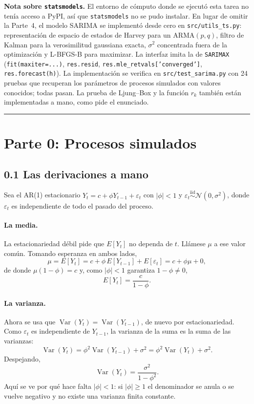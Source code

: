 \documentclass[11pt]{article}
\begin{document}
\textbf{Nota sobre \texttt{statsmodels}.} El entorno de c\'omputo donde se
ejecut\'o esta tarea no ten\'ia acceso a PyPI, as\'i que
\texttt{statsmodels} no se pudo instalar. En lugar de omitir la Parte~4, el
modelo SARIMA se implement\'o desde cero en \texttt{src/utils\_ts.py}:
representaci\'on de espacio de estados de Harvey para un ARMA$(p,q)$, filtro
de Kalman para la verosimilitud gaussiana exacta, $\sigma^2$ concentrada
fuera de la optimizaci\'on y L-BFGS-B para maximizar. La interfaz imita la
de \texttt{SARIMAX} (\texttt{fit(maxiter=...)}, \texttt{res.resid},
\texttt{res.mle\_retvals['converged']}, \texttt{res.forecast(h)}). La
implementaci\'on se verifica en \texttt{src/test\_sarima.py} con
\num{24} pruebas que recuperan los par\'ametros de procesos simulados con
valores conocidos; todas pasan. La prueba de Ljung--Box y la funci\'on
$r_k$ tambi\'en est\'an implementadas a mano, como pide el enunciado.
\normalsize
\noindent\rule{\textwidth}{0.4pt}

\tableofcontents
\newpage

\section{Parte 0: Procesos simulados}

\subsection{0.1 Las derivaciones a mano}

Sea el AR(1) estacionario $Y_t = c + \phi Y_{t-1} + \varepsilon_t$ con
$|\phi| < 1$ y $\varepsilon_t \stackrel{\text{iid}}{\sim}
\mathcal{N}(0,\sigma^2)$, donde $\varepsilon_t$ es independiente de todo el
pasado del proceso.

\paragraph{La media.} La estacionariedad d\'ebil pide que $E[Y_t]$ no
dependa de $t$. Ll\'amese $\mu$ a ese valor com\'un. Tomando esperanza en
ambos lados,
\[
\mu = E[Y_t] = c + \phi\, E[Y_{t-1}] + E[\varepsilon_t] = c + \phi\mu + 0,
\]
de donde $\mu(1-\phi) = c$ y, como $|\phi|<1$ garantiza $1-\phi \neq 0$,
\[
\boxed{\;E[Y_t] = \frac{c}{1-\phi}.\;}
\]

\paragraph{La varianza.} Ahora se usa que $\operatorname{Var}(Y_t) =
\operatorname{Var}(Y_{t-1})$, de nuevo por estacionariedad. Como
$\varepsilon_t$ es independiente de $Y_{t-1}$, la varianza de la suma es la
suma de las varianzas:
\[
\operatorname{Var}(Y_t) = \phi^2 \operatorname{Var}(Y_{t-1}) + \sigma^2
= \phi^2 \operatorname{Var}(Y_t) + \sigma^2 .
\]
Despejando,
\[
\boxed{\;\operatorname{Var}(Y_t) = \frac{\sigma^2}{1-\phi^2}.\;}
\]
Aqu\'i se ve por qu\'e hace falta $|\phi|<1$: si $|\phi| \ge 1$ el
denominador se anula o se vuelve negativo y no existe una varianza finita
constante.
\end{document}
